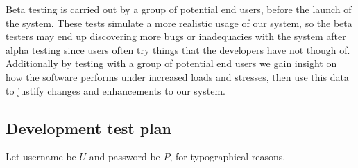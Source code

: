 Beta testing is carried out by a group of potential end
users, before the launch of the system. These tests 
simulate a more realistic usage of our system, so the 
beta testers may end up discovering more bugs or 
inadequacies with the system after alpha testing since users
often try things that the developers have not though of. 
Additionally by testing with a group of potential end users 
we gain insight on how the software performs under increased 
loads and stresses, then use this data to justify changes
and enhancements to our system.

\subsection{Development test plan}

%

Let username be $U$ and password be $P$, for 
typographical reasons.


